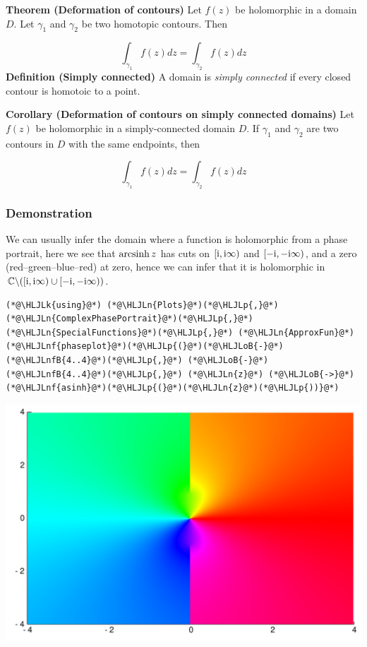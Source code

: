 \documentclass[12pt,a4paper]{article}
\newcommand{\HLJLk}[1]{\textcolor[RGB]{148,91,176}{\textbf{#1}}}
\newcommand{\HLJLn}[1]{#1}
\newcommand{\HLJLnf}[1]{\textcolor[RGB]{66,102,213}{#1}}
\newcommand{\HLJLnfB}[1]{\textcolor[RGB]{59,151,46}{#1}}
\newcommand{\HLJLoB}[1]{\textcolor[RGB]{102,102,102}{\textbf{#1}}}
\newcommand{\HLJLp}[1]{#1}
\def\I{ {\rm i} }
\def\C{ {\mathbb C} }
\def\endash{–}
\begin{document}
\textbf{Theorem (Deformation of contours)} Let $f(z)$ be holomorphic in a domain $D$. Let $\gamma_1$ and $\gamma_2$ be two homotopic contours. Then

\[
    \int_{\gamma_1} f(z) dz = \int_{\gamma_2} f(z) dz
\]
\textbf{Definition (Simply connected)} A domain is \emph{simply connected} if every closed contour is homotoic to a point.

\textbf{Corollary (Deformation of contours on simply connected domains)} Let $f(z)$ be holomorphic in a simply-connected domain $D$. If $\gamma_1$ and $\gamma_2$ are two contours in $D$ with the same endpoints, then

\[
    \int_{\gamma_1} f(z) dz = \int_{\gamma_2} f(z) dz
\]
\subsubsection{Demonstration}
We can usually infer the domain where a function is holomorphic from a phase portrait, here we see that ${\rm arcsinh}\, z$ has cuts on $[\I,\I \infty)$ and $[-\I,-\I \infty)$, and a zero  (red\ensuremath{\endash}green\ensuremath{\endash}blue\ensuremath{\endash}red) at zero, hence we can infer that it is holomorphic in $\C \backslash ([\I,\I \infty) \cup [-\I,-\I \infty))$.


\begin{lstlisting}
(*@\HLJLk{using}@*) (*@\HLJLn{Plots}@*)(*@\HLJLp{,}@*) (*@\HLJLn{ComplexPhasePortrait}@*)(*@\HLJLp{,}@*) (*@\HLJLn{SpecialFunctions}@*)(*@\HLJLp{,}@*) (*@\HLJLn{ApproxFun}@*)
(*@\HLJLnf{phaseplot}@*)(*@\HLJLp{(}@*)(*@\HLJLoB{-}@*)(*@\HLJLnfB{4..4}@*)(*@\HLJLp{,}@*) (*@\HLJLoB{-}@*)(*@\HLJLnfB{4..4}@*)(*@\HLJLp{,}@*) (*@\HLJLn{z}@*) (*@\HLJLoB{->}@*) (*@\HLJLnf{asinh}@*)(*@\HLJLp{(}@*)(*@\HLJLn{z}@*)(*@\HLJLp{))}@*)
\end{lstlisting}

\includegraphics[width=\linewidth]{figures/Lecture1_18_1.pdf}
\end{document}
